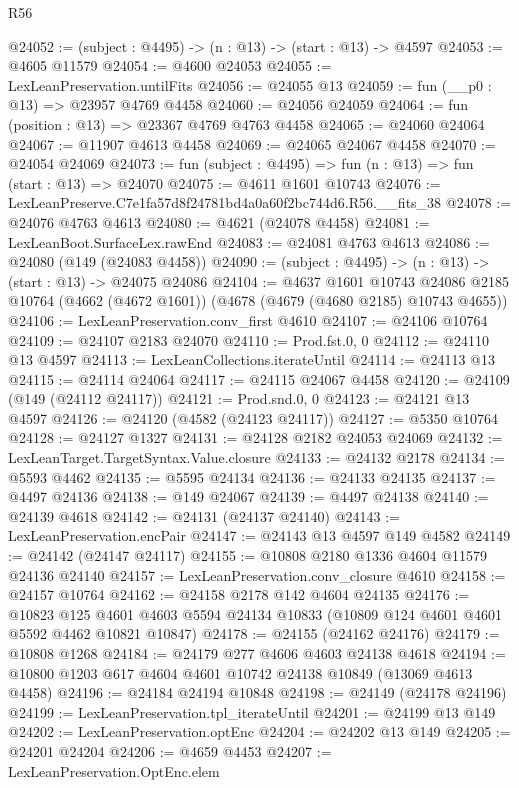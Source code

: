 \begin{lexlean}{R56}
\begin{coremodule}
@24052 := (subject : @4495) -> (n : @13) -> (start : @13) -> @4597
@24053 := @4605 @11579
@24054 := @4600 @24053
@24055 := LexLeanPreservation.untilFits
@24056 := @24055 @13
@24059 := fun (__p0 : @13) => @23957 @4769 @4458
@24060 := @24056 @24059
@24064 := fun (position : @13) => @23367 @4769 @4763 @4458
@24065 := @24060 @24064
@24067 := @11907 @4613 @4458
@24069 := @24065 @24067 @4458
@24070 := @24054 @24069
@24073 := fun (subject : @4495) => fun (n : @13) => fun (start : @13) => @24070
@24075 := @4611 @1601 @10743
@24076 := LexLeanPreserve.C7e1fa57d8f24781bd4a0a60f2bc744d6.R56.__fits_38
@24078 := @24076 @4763 @4613
@24080 := @4621 (@24078 @4458)
@24081 := LexLeanBoot.SurfaceLex.rawEnd
@24083 := @24081 @4763 @4613
@24086 := @24080 (@149 (@24083 @4458))
@24090 := (subject : @4495) -> (n : @13) -> (start : @13) -> @24075 @24086
@24104 := @4637
    @1601
    @10743
    @24086
    @2185
    @10764
    (@4662 (@4672 @1601))
    (@4678 (@4679 (@4680 @2185) @10743 @4655))
@24106 := LexLeanPreservation.conv_first @4610
@24107 := @24106 @10764
@24109 := @24107 @2183 @24070
@24110 := Prod.fst.{0, 0}
@24112 := @24110 @13 @4597
@24113 := LexLeanCollections.iterateUntil
@24114 := @24113 @13
@24115 := @24114 @24064
@24117 := @24115 @24067 @4458
@24120 := @24109 (@149 (@24112 @24117))
@24121 := Prod.snd.{0, 0}
@24123 := @24121 @13 @4597
@24126 := @24120 (@4582 (@24123 @24117))
@24127 := @5350 @10764
@24128 := @24127 @1327
@24131 := @24128 @2182 @24053 @24069
@24132 := LexLeanTarget.TargetSyntax.Value.closure
@24133 := @24132 @2178
@24134 := @5593 @4462
@24135 := @5595 @24134
@24136 := @24133 @24135
@24137 := @4497 @24136
@24138 := @149 @24067
@24139 := @4497 @24138
@24140 := @24139 @4618
@24142 := @24131 (@24137 @24140)
@24143 := LexLeanPreservation.encPair
@24147 := @24143 @13 @4597 @149 @4582
@24149 := @24142 (@24147 @24117)
@24155 := @10808 @2180 @1336 @4604 @11579 @24136 @24140
@24157 := LexLeanPreservation.conv_closure @4610
@24158 := @24157 @10764
@24162 := @24158 @2178 @142 @4604 @24135
@24176 := @10823
    @125
    @4601
    @4603
    @5594
    @24134
    @10833
    (@10809 @124 @4601 @4601 @5592 @4462 @10821 @10847)
@24178 := @24155 (@24162 @24176)
@24179 := @10808 @1268
@24184 := @24179 @277 @4606 @4603 @24138 @4618
@24194 := @10800 @1203 @617 @4604 @4601 @10742 @24138 @10849 (@13069 @4613 @4458)
@24196 := @24184 @24194 @10848
@24198 := @24149 (@24178 @24196)
@24199 := LexLeanPreservation.tpl_iterateUntil
@24201 := @24199 @13 @149
@24202 := LexLeanPreservation.optEnc
@24204 := @24202 @13 @149
@24205 := @24201 @24204
@24206 := @4659 @4453
@24207 := LexLeanPreservation.OptEnc.elem

\end{coremodule}
\end{lexlean}
